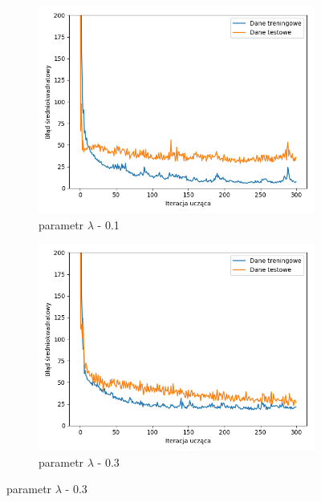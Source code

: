 \documentclass[12pt]{aghdpl}
\begin{document}
		 \begin{figure}[h]
		 	\begin{subfigure}{.5\linewidth}
		 		\includegraphics[width =\linewidth]{wykresy/6_regularyzacja/l2/regularyzacja_0_1_wykres_uczenia.png}
		 		\caption{parametr $\lambda$ - 0.1}
		 	\end{subfigure}
		 	\begin{subfigure}{.5\linewidth}
		 		\includegraphics[width =\linewidth]{wykresy/6_regularyzacja/l2/regularyzacja_0_3_wykres_uczenia.png}
		 		\caption{parametr $\lambda$ - 0.3}
		 	\end{subfigure}
		 	

\end{figure}
\end{document}
